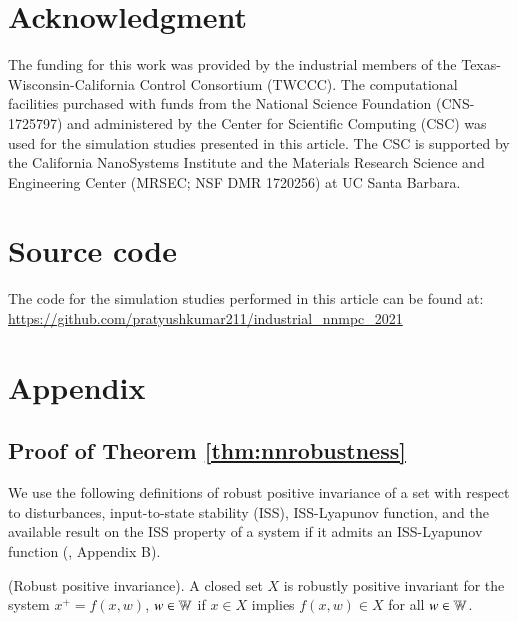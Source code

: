 \documentclass[preprint,5p, twocolumn, authoryear]{elsarticle}
\begin{document}
\section*{Acknowledgment}
The funding for this work was provided by the industrial members of the
Texas-Wisconsin-California Control Consortium (TWCCC). The computational
facilities purchased with funds from the National Science Foundation
(CNS-1725797) and administered by the Center for Scientific Computing (CSC) was
used for the simulation studies presented in this article. The CSC is supported
by the California NanoSystems Institute and the Materials Research Science and
Engineering Center (MRSEC; NSF DMR 1720256) at UC Santa Barbara.

\section*{Source code}
The code for the simulation studies performed in this article can be found at:
\url{https://github.com/pratyushkumar211/industrial_nnmpc_2021}




\section*{Appendix}
\renewcommand{\thesubsection}{\Alph{subsection}}

\subsection{Proof of Theorem \ref{thm:nnrobustness}} \label{app:theorem1}

We use the following definitions of robust positive invariance of a set with
respect to disturbances, input-to-state stability (ISS), ISS-Lyapunov function,
and the available result on the ISS property of a system if it admits an
ISS-Lyapunov function (\cite*{jiang:wang:2001, rawlings:mayne:diehl:2017},
Appendix B).

\begin{definition} \label{def:robust_pos_invariance} (Robust positive
invariance). A closed set $X$ is robustly positive invariant for the system $x^+
= f(x, w)$, $w \in \mathbb{W}$ if $x \in X$ implies $f(x, w) \in X$ for all $w \in
\mathbb{W}$.
\end{definition}
\end{document}
